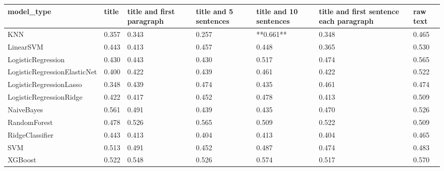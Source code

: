 \begin{tabular}{lllllll}
\toprule
                  model\_type & title & title and first paragraph & title and 5 sentences & title and 10 sentences & title and first sentence each paragraph & raw text \\
\midrule
                         KNN & 0.357 &                     0.343 &                 0.257 &              **0.661** &                                   0.348 &    0.465 \\
                   LinearSVM & 0.443 &                     0.413 &                 0.457 &                  0.448 &                                   0.365 &    0.530 \\
          LogisticRegression & 0.430 &                     0.443 &                 0.430 &                  0.517 &                                   0.474 &    0.565 \\
LogisticRegressionElasticNet & 0.400 &                     0.422 &                 0.439 &                  0.461 &                                   0.422 &    0.522 \\
     LogisticRegressionLasso & 0.348 &                     0.439 &                 0.474 &                  0.435 &                                   0.461 &    0.474 \\
     LogisticRegressionRidge & 0.422 &                     0.417 &                 0.452 &                  0.478 &                                   0.413 &    0.509 \\
                  NaiveBayes & 0.561 &                     0.491 &                 0.439 &                  0.435 &                                   0.470 &    0.526 \\
                RandomForest & 0.478 &                     0.526 &                 0.565 &                  0.509 &                                   0.522 &    0.509 \\
             RidgeClassifier & 0.443 &                     0.413 &                 0.404 &                  0.413 &                                   0.404 &    0.465 \\
                         SVM & 0.513 &                     0.491 &                 0.452 &                  0.487 &                                   0.474 &    0.483 \\
                     XGBoost & 0.522 &                     0.548 &                 0.526 &                  0.574 &                                   0.517 &    0.570 \\
\bottomrule
\end{tabular}
